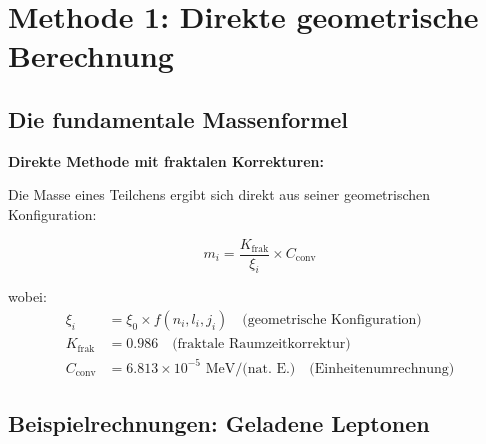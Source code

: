 \documentclass[12pt,a4paper]{article}
\begin{document}
	\section{Methode 1: Direkte geometrische Berechnung}
	
	\subsection{Die fundamentale Massenformel}
	
	\begin{method}
		\textbf{Direkte Methode mit fraktalen Korrekturen:}
		
		Die Masse eines Teilchens ergibt sich direkt aus seiner geometrischen Konfiguration:
		
		\begin{equation}
			\boxed{m_i = \frac{K_{\text{frak}}}{\xi_i} \times C_{\text{conv}}}
			\label{eq:direct_mass}
		\end{equation}
		
		wobei:
		\begin{align}
			\xi_i &= \xi_0 \times f(n_i, l_i, j_i) \quad \text{(geometrische Konfiguration)} \\
			K_{\text{frak}} &= 0.986 \quad \text{(fraktale Raumzeitkorrektur)} \\
			C_{\text{conv}} &= 6.813 \times 10^{-5} \text{ MeV/(nat. E.)} \quad \text{(Einheitenumrechnung)}
		\end{align}
	\end{method}
	
	\subsection{Beispielrechnungen: Geladene Leptonen}
	
\end{document}
